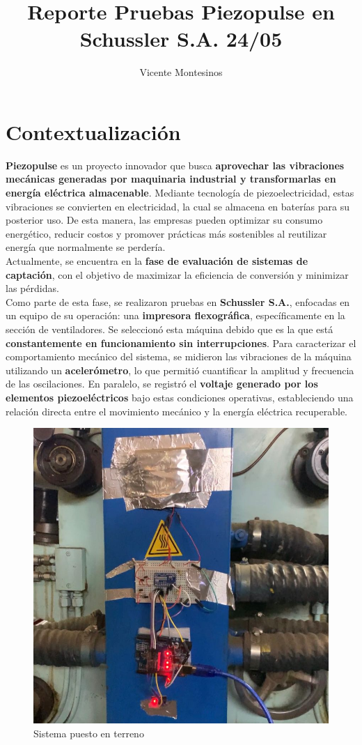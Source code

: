 \documentclass{article}
\title{Reporte Pruebas Piezopulse en Schussler S.A. 24/05}
\author{Vicente Montesinos}
\begin{document}
\maketitle
\tableofcontents
\newpage
\section{Contextualización}

\textbf{Piezopulse} es un proyecto innovador que busca \textbf{aprovechar las vibraciones mecánicas generadas por maquinaria industrial y transformarlas en energía eléctrica almacenable}. Mediante tecnología de piezoelectricidad, estas vibraciones se convierten en electricidad, la cual se almacena en baterías para su posterior uso. De esta manera, las empresas pueden optimizar su consumo energético, reducir costos y promover prácticas más sostenibles al reutilizar energía que normalmente se perdería.\\
Actualmente, se encuentra en la \textbf{fase de evaluación de sistemas de captación}, con el objetivo de maximizar la eficiencia de conversión y minimizar las pérdidas.\\ 
Como parte de esta fase, se realizaron pruebas en \textbf{Schussler S.A.}, enfocadas en un equipo de su operación: una \textbf{impresora flexográfica}, específicamente en la sección de ventiladores. Se seleccionó esta máquina debido que es la que está \textbf{constantemente en funcionamiento sin interrupciones}. Para caracterizar el comportamiento mecánico del sistema, se midieron las vibraciones de la máquina utilizando un \textbf{acelerómetro}, lo que permitió cuantificar la amplitud y frecuencia de las oscilaciones. En paralelo, se registró el \textbf{voltaje generado por los elementos piezoeléctricos} bajo estas condiciones operativas, estableciendo una relación directa entre el movimiento mecánico y la energía eléctrica recuperable.\\
\begin{figure}[H]
    \centering
    \includegraphics[width=.8\textwidth]{Sistema.jpg}
    \caption{Sistema puesto en terreno}
    \label{fig:my_label}
\end{figure}
\newpage
\end{document}
